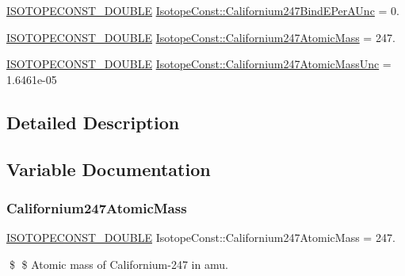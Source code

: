 \begin{DoxyCompactItemize}
\item 
\mbox{\hyperlink{group___isotope_const-_macros_ga8f45a7272ce02c0b4c65c44636ed719a}{I\+S\+O\+T\+O\+P\+E\+C\+O\+N\+S\+T\+\_\+\+D\+O\+U\+B\+LE}} \mbox{\hyperlink{group___isotope_const-_californium-_cf247_ga360d99c12ebcdad5ea13a35feab543ea}{Isotope\+Const\+::\+Californium247\+Bind\+E\+Per\+A\+Unc}} = 0.
\item 
\mbox{\hyperlink{group___isotope_const-_macros_ga8f45a7272ce02c0b4c65c44636ed719a}{I\+S\+O\+T\+O\+P\+E\+C\+O\+N\+S\+T\+\_\+\+D\+O\+U\+B\+LE}} \mbox{\hyperlink{group___isotope_const-_californium-_cf247_gafc1dcd8d18af0ab7ca2a439404d32cf7}{Isotope\+Const\+::\+Californium247\+Atomic\+Mass}} = 247.
\item 
\mbox{\hyperlink{group___isotope_const-_macros_ga8f45a7272ce02c0b4c65c44636ed719a}{I\+S\+O\+T\+O\+P\+E\+C\+O\+N\+S\+T\+\_\+\+D\+O\+U\+B\+LE}} \mbox{\hyperlink{group___isotope_const-_californium-_cf247_gab929ff6c2db00b79a7d69d2e167033bb}{Isotope\+Const\+::\+Californium247\+Atomic\+Mass\+Unc}} = 1.\+6461e-\/05
\end{DoxyCompactItemize}


\subsection{Detailed Description}


\subsection{Variable Documentation}
\mbox{\label{group___isotope_const-_californium-_cf247_gafc1dcd8d18af0ab7ca2a439404d32cf7}} 
\subsubsection{\texorpdfstring{Californium247\+Atomic\+Mass}{Californium247AtomicMass}}
{\footnotesize\ttfamily \mbox{\hyperlink{group___isotope_const-_macros_ga8f45a7272ce02c0b4c65c44636ed719a}{I\+S\+O\+T\+O\+P\+E\+C\+O\+N\+S\+T\+\_\+\+D\+O\+U\+B\+LE}} Isotope\+Const\+::\+Californium247\+Atomic\+Mass = 247.}

\$ \$ Atomic mass of Californium-\/247 in amu. \mbox{\label{group___isotope_const-_californium-_cf247_gab929ff6c2db00b79a7d69d2e167033bb}} 
